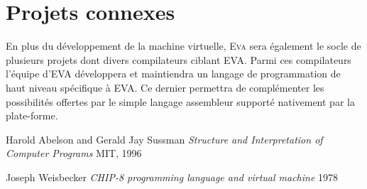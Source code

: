 \documentclass[11pt,twoside,french]{article}
\newcommand{\noun}[1]{\textsc{#1}}
\newcommand{\noun}[1]{\textsc{#1}}
\begin{document}
\section{Projets connexes}

En plus du développement de la machine virtuelle, \noun{Eva} sera
également le socle de plusieurs projets dont divers compilateurs ciblant
EVA. Parmi ces compilateurs l'équipe d'EVA développera et maintiendra
un langage de programmation de haut niveau spécifique à EVA. Ce dernier
permettra de complémenter les possibilités offertes par le simple langage
assembleur supporté nativement par la plate-forme.

\newpage{}

\clearpage{}

\begin{thebibliography}{XXXXXX}
\label{chap:bib}

 Harold Abelson and Gerald Jay Sussman
\emph{Structure and Interpretation of Computer Programs} MIT, 1996

 Joseph Weisbecker
\emph{CHIP-8 programming language and virtual machine} 1978

\end{thebibliography}
\end{document}
